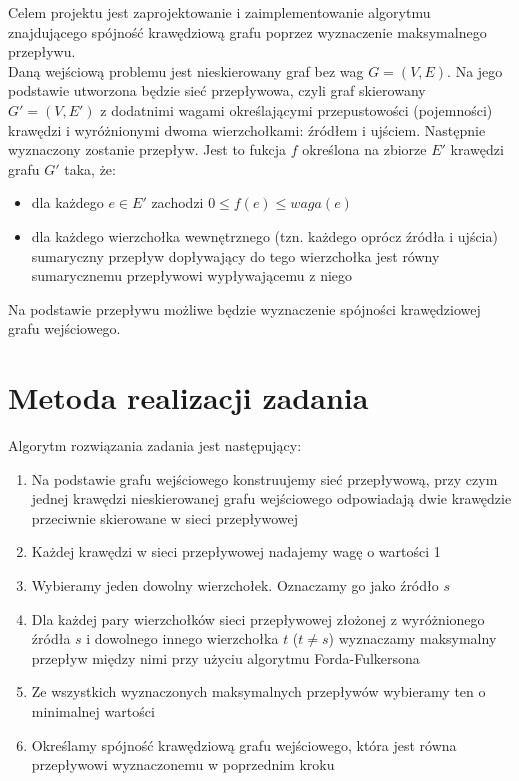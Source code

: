 \documentclass{article}
\begin{document}
Celem projektu jest zaprojektowanie i zaimplementowanie algorytmu znajdującego spójność krawędziową grafu poprzez wyznaczenie maksymalnego przepływu.\\

Daną wejściową problemu jest nieskierowany graf bez wag $G=(V,E)$. Na jego podstawie utworzona będzie sieć przepływowa, czyli graf skierowany $G'=(V,E')$ z dodatnimi wagami określającymi przepustowości (pojemności) krawędzi i wyróżnionymi dwoma wierzchołkami: źródłem i ujściem. Następnie wyznaczony zostanie przepływ. Jest to fukcja $f$ określona na zbiorze $E'$ krawędzi grafu $G'$ taka, że:
\begin{itemize}
    \item dla każdego $e\in E'$ zachodzi $0\le f(e)\le waga(e)$
    \item dla każdego wierzchołka wewnętrznego (tzn. każdego oprócz źródła i ujścia) sumaryczny przepływ dopływający do tego wierzchołka jest równy sumarycznemu przepływowi wypływającemu z niego
\end{itemize}
Na podstawie przepływu możliwe będzie wyznaczenie spójności krawędziowej grafu wejściowego.


\section{Metoda realizacji zadania}

Algorytm rozwiązania zadania jest następujący:
\begin{enumerate}
\item Na podstawie grafu wejściowego konstruujemy sieć przepływową, przy czym jednej krawędzi nieskierowanej grafu wejściowego odpowiadają dwie krawędzie przeciwnie skierowane w sieci przepływowej
\item Każdej krawędzi w sieci przepływowej nadajemy wagę o wartości 1
\item Wybieramy jeden dowolny wierzchołek. Oznaczamy go jako źródło $s$
\item Dla każdej pary wierzchołków sieci przepływowej złożonej z wyróżnionego źródła $s$ i dowolnego innego wierzchołka $t$ ($t \neq s$) wyznaczamy maksymalny przepływ między nimi przy użyciu algorytmu Forda-Fulkersona
\item Ze wszystkich wyznaczonych maksymalnych przepływów wybieramy ten o minimalnej wartości
\item Określamy spójność krawędziową grafu wejściowego, która jest równa przepływowi wyznaczonemu w poprzednim kroku
\end{enumerate}
\end{document}
